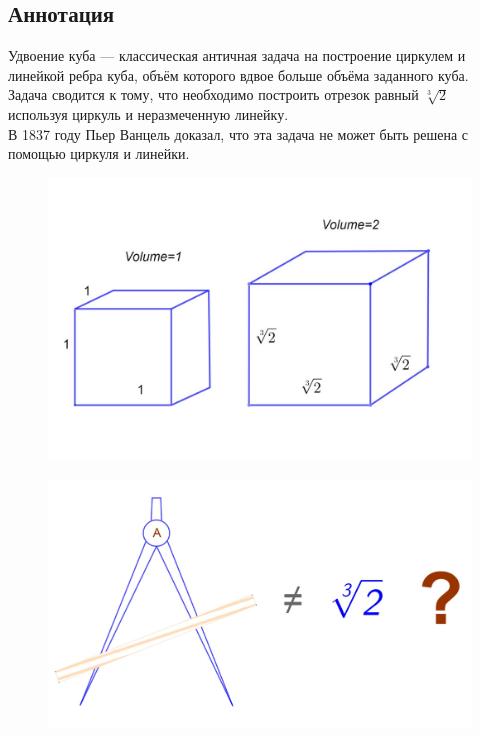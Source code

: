 \documentclass[12pt, letterpaper, oneside]{report}
\begin{document}
\begin{center}
\section*{Аннотация}
\end{center}
Удвоение куба — классическая античная задача на построение циркулем и линейкой ребра куба, объём которого вдвое больше объёма заданного куба\cite{A}.
\\
Задача сводится к тому, что необходимо построить отрезок равный $\sqrt[3]{2}$ используя циркуль и неразмеченную линейку.
\\
 В 1837 году Пьер Ванцель доказал, что эта задача не может быть решена с помощью циркуля и линейки.
\\
\begin{figure}[h]
	\centering
	\includegraphics[width=0.7\linewidth]{images/cubes.jpg}
	\label{fig:cubes}
\end{figure}
\begin{figure}[h]
	\centering
	\includegraphics[width=0.8\linewidth]{images/compass.jpg}
	\label{fig:compass}
\end{figure}
\newpage

\tableofcontents


\chapter{}
\end{document}
